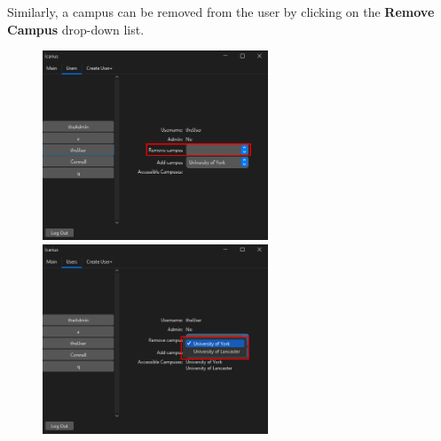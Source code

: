 \begin{enumerate}
    Similarly, a campus can be removed from the user by clicking on the \textbf{Remove Campus} drop-down list.
    \begin{figure}[H]
        \centering
        \includegraphics[width=0.6\textwidth]{UsersTab/editUser/editUserRemove.png}
        \includegraphics[width=0.6\textwidth]{UsersTab/editUser/editUserRemoveView.png}
    \end{figure}
\end{enumerate}